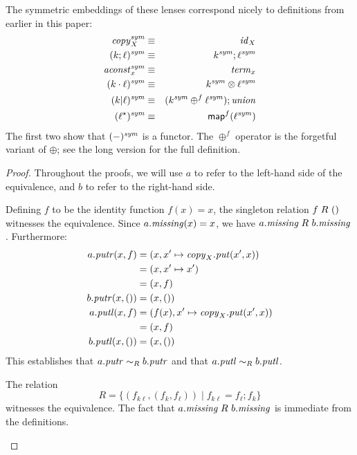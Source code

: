 \begin{defn}[$R$-similarity]
\begin{theorem}
\begin{lemma}
\begin{theorem}[No products]
\begin{lemma}
\begin{defn}
\begin{theorem}
\begin{corollary}[Hylomorphism]
\begin{defn}
\begin{defn}[Symmetrization]
\begin{theorem} The symmetric embeddings of these lenses correspond nicely
    to definitions from earlier in this paper:
\setcounter{equation}{0}
\begin{eqnarray}
    \mathit{copy}_X^\mathit{sym}        &\equiv& \mathit{id}_X \\
    (k;\ell)^\mathit{sym}        &\equiv& k^\mathit{sym};\ell^\mathit{sym} \\
    \mathit{aconst}_x^\mathit{sym}       &\equiv& \mathit{term}_x \\
    (k\cdot\ell)^\mathit{sym}    &\equiv& k^\mathit{sym}\otimes\ell^\mathit{sym} \\
    (k|\ell)^\mathit{sym}        &\equiv& (k^\mathit{sym} \oplus^f \ell^\mathit{sym});\mathit{union} \\
    (\ell^\star)^\mathit{sym}     &\equiv& \mathsf{map}^f(\ell^\mathit{sym})
\end{eqnarray}
The first two show that $(-)^\mathit{sym}$ is a functor. \iffull\else The $\oplus^f$ operator is
the forgetful variant of $\oplus$; see the long version for the full
definition.\fi
\end{theorem}

\iffull
{}
\begin{proof} Throughout the proofs, we will use $a$ to refer to the
left-hand side of the equivalence, and $b$ to refer to the right-hand side.

\begin{longenum}
\item Defining $f$ to be the identity function $f(x)=x$, the singleton
relation $f \mathrel{R_{}} {()}$ witnesses the equivalence. Since $a.\mathit{missing}(x) =
x$, we have $a.\mathit{missing} \mathrel{R_{}} b.\mathit{missing}$. Furthermore:
\begin{align*}
    a.\mathit{putr}(x,f) &= (x,x' \mapsto \mathit{copy}_X.\mathit{put}(x',x)) \\
    &= (x, x' \mapsto x') \\
    &= (x, f) \\
    b.\mathit{putr}(x,{()}) &= (x,{()}) \\
    a.\mathit{putl}(x,f) &= (f(x),x' \mapsto \mathit{copy}_X.\mathit{put}(x',x)) \\
    &= (x,f) \\
    b.\mathit{putl}(x,{()}) &= (x,{()})
\end{align*}
This establishes that $a.\mathit{putr} \sim_R b.\mathit{putr}$ and that $a.\mathit{putl} \sim_R
b.\mathit{putl}$.

\item The relation
\[R = \{(f_{k\ell},(f_k,f_\ell)) \mid f_{k\ell} = f_\ell;f_k\}\]
witnesses the equivalence. The fact that $a.\mathit{missing} \mathrel{R_{}} b.\mathit{missing}$ is
immediate from the definitions.


\end{longenum}
\end{proof}
\end{defn}
\end{defn}
\end{corollary}
\end{theorem}
\end{defn}
\end{lemma}
\end{theorem}
\end{lemma}
\end{theorem}
\end{defn}
